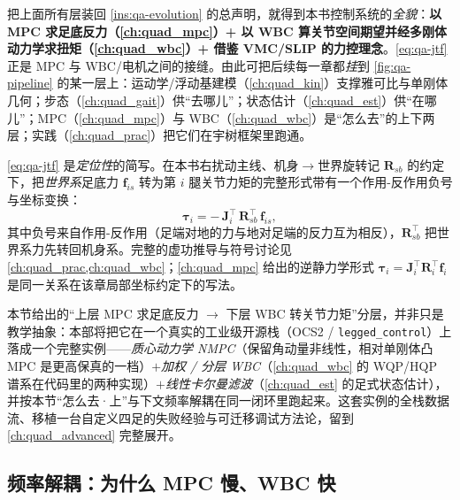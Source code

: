 \begin{insight}\label{ins:qa-assemble}
把上面所有层装回 \cref{ins:qa-evolution} 的总声明，就得到本书控制系统的\emph{全貌}：\textbf{以 MPC 求足底反力（\cref{ch:quad_mpc}）+ 以 WBC 算关节空间期望并经多刚体动力学求扭矩（\cref{ch:quad_wbc}）+ 借鉴 VMC/SLIP 的力控理念}\cite{yu2021quadruped}。\cref{eq:qa-jtf} 正是 MPC 与 WBC/电机之间的接缝。由此可把后续每一章都\emph{挂}到 \cref{fig:qa-pipeline} 的某一层上：运动学/浮动基建模（\cref{ch:quad_kin}）支撑雅可比与单刚体几何；步态（\cref{ch:quad_gait}）供“去哪儿”；状态估计（\cref{ch:quad_est}）供“在哪儿”；MPC（\cref{ch:quad_mpc}）与 WBC（\cref{ch:quad_wbc}）是“怎么去”的上下两层；实践（\cref{ch:quad_prac}）把它们在宇树框架里跑通。
\end{insight}

\begin{note}\label{note:qa-jtf-sign}
\cref{eq:qa-jtf} 是\emph{定位性}的简写。在本书右扰动主线、机身$\to$世界旋转记 $\mathbf{R}_{sb}$ 的约定下，把\emph{世界系}足底力 $\mathbf{f}_{is}$ 转为第 $i$ 腿关节力矩的完整形式带有一个作用-反作用负号与坐标变换：
\[
  \boldsymbol\tau_i=-\,\mathbf{J}_i^\top\,\mathbf{R}_{sb}^\top\,\mathbf{f}_{is},
\]
其中负号来自作用-反作用（足端对地的力与地对足端的反力互为相反），$\mathbf{R}_{sb}^\top$ 把世界系力先转回机身系。完整的虚功推导与符号讨论见 \cref{ch:quad_prac,ch:quad_wbc}；\cref{ch:quad_mpc} 给出的逆静力学形式 $\boldsymbol\tau_i=\mathbf{J}_i^\top\mathbf{R}_i^\top\mathbf{f}_i$ 是同一关系在该章局部坐标约定下的写法。
\end{note}

\begin{note}\label{note:qa-ocs2-pointer}
本节给出的“上层 MPC 求足底反力 $\to$ 下层 WBC 转关节力矩”分层，并非只是教学抽象：本部将把它在一个真实的工业级开源栈（OCS2 / \texttt{legged\_control}）上落成一个完整实例——\emph{质心动力学 NMPC}（保留角动量非线性，相对单刚体凸 MPC 是更高保真的一档）$+$\emph{加权 / 分层 WBC}（\cref{ch:quad_wbc} 的 WQP/HQP 谱系在代码里的两种实现）$+$\emph{线性卡尔曼滤波}（\cref{ch:quad_est} 的足式状态估计），并按本节“怎么去·上”与下文频率解耦在同一闭环里跑起来\cite{sleiman2021unified,grandia2022perceptive,liao2023walking}。这套实例的全栈数据流、移植一台自定义四足的失败经验与可迁移调试方法论，留到 \cref{ch:quad_advanced} 完整展开。
\end{note}

\subsection{频率解耦：为什么 MPC 慢、WBC 快}
\label{subsec:qa-freq}

